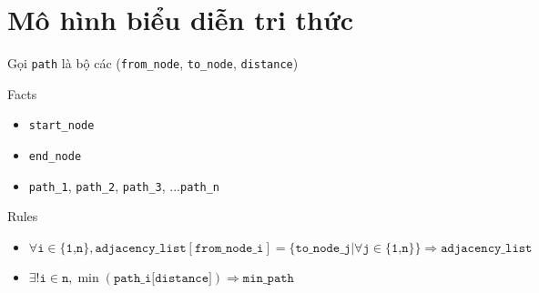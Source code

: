 \section{Mô hình biểu diễn tri thức} 

Gọi \texttt{path} là bộ các (\texttt{from\_node}, \texttt{to\_node}, \texttt{distance})

Facts
\begin{itemize}
	\item \texttt{start\_node}
	\item \texttt{end\_node}
	\item \texttt{path\_1}, \texttt{path\_2}, \texttt{path\_3}, ...\texttt{path\_n}
\end{itemize}

Rules
\begin{itemize}
	\item $\forall \texttt{i} \in \{\texttt{1,n}\}, \texttt{adjacency\_list}[\texttt{from\_node\_i}]=\{ \texttt{to\_node\_j} | \forall \texttt{j} \in \{\texttt{1,n}\}\} \Rightarrow \texttt{adjacency\_list}$
	\item $\exists! \texttt{i} \in \texttt{n}, \min(\texttt{path\_i[distance]}) \Rightarrow \texttt{min\_path}$
\end{itemize}
